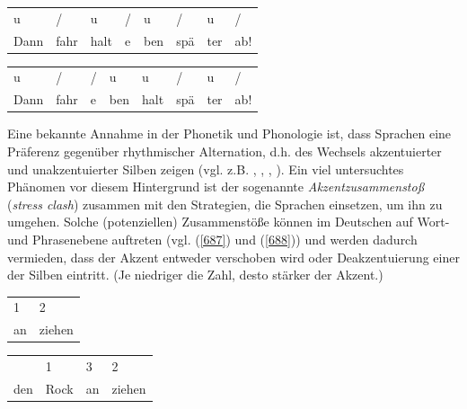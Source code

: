\begin{exe}
	\ex\label{686} 
	\begin{xlist} 
	\ex\label{686a}
	\begin{tabular}[t]{llllllll}
	u & / & u & / & u & / & u & /\\
	Dann & fahr & halt & e & ben & spä & ter & ab!
    \end{tabular}
    \ex\label{686b}
	\begin{tabular}[t]{llllllll}
	u & / & / & u & u & / & u & /\\
	Dann & fahr & e & ben & halt & spä & ter & ab!
    \end{tabular}
\end{xlist}    
\end{exe}			
Eine bekannte Annahme in der Phonetik und Phonologie ist, dass Sprachen eine Präferenz gegenüber rhythmischer Alternation, d.h. des Wechsels akzentuierter und unakzentuierter Silben zeigen (vgl. z.B. \citealt[1]{Wagner2002}, \citealt[141]{Gussenhoven2004}, \citealt[18-24]{Schlueter2005}, \citealt[332]{Bohn2011}). Ein viel untersuchtes Phänomen vor diesem Hintergrund ist der sogenannte \textit{Ak\-zentzusammenstoß} (\textit{stress clash}) zusammen mit den Strategien, die Sprachen einsetzen, um ihn zu umgehen. Solche (potenziellen) Zusammenstöße können im Deutschen auf Wort- und Phrasenebene auftreten (vgl. (\ref{687}) und (\ref{688})) und werden dadurch vermieden, dass der Akzent entweder verschoben wird oder Deakzentuierung einer der Silben eintritt. (Je niedriger die Zahl, desto stärker der Akzent.)
\pagebreak
\begin{exe}
	\ex\label{687} 
	\begin{xlist} 
	\ex\label{687a}
	\begin{tabular}[t]{ll}
	1 & 2 \\
	an & ziehen
    \end{tabular}
    \ex\label{687b}
	\begin{tabular}[t]{llll}
	{} & 1 & 3 & 2 \\
	den & Rock & an & ziehen
    \end{tabular}
\end{xlist}    
\end{exe}

